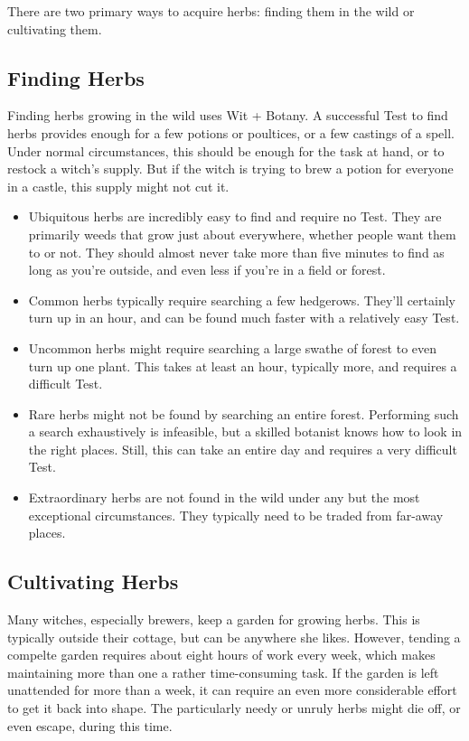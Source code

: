 There are two primary ways to acquire herbs: finding them in the wild or cultivating them.

\subsection{Finding Herbs}

Finding herbs growing in the wild uses Wit + Botany.
A successful Test to find herbs provides enough for a few potions or poultices, or a few castings of a spell.
Under normal circumstances, this should be enough for the task at hand, or to restock a witch's supply.
But if the witch is trying to brew a potion for everyone in a castle, this supply might not cut it.

\begin{itemize}
	\item Ubiquitous herbs are incredibly easy to find and require no Test.
		They are primarily weeds that grow just about everywhere, whether people want them to or not.
		They should almost never take more than five minutes to find as long as you're outside, and even less if you're in a field or forest.
	\item Common herbs typically require searching a few hedgerows.
		They'll certainly turn up in an hour, and can be found much faster with a relatively easy Test.
	\item Uncommon herbs might require searching a large swathe of forest to even turn up one plant.
		This takes at least an hour, typically more, and requires a difficult Test.
	\item Rare herbs might not be found by searching an entire forest.
		Performing such a search exhaustively is infeasible, but a skilled botanist knows how to look in the right places.
		Still, this can take an entire day and requires a very difficult Test.
	\item Extraordinary herbs are not found in the wild under any but the most exceptional circumstances.
		They typically need to be traded from far-away places.
\end{itemize}

\subsection{Cultivating Herbs}

Many witches, especially brewers, keep a garden for growing herbs.
This is typically outside their cottage, but can be anywhere she likes.
However, tending a compelte garden requires about eight hours of work every week, which makes maintaining more than one a rather time-consuming task.
If the garden is left unattended for more than a week, it can require an even more considerable effort to get it back into shape.
The particularly needy or unruly herbs might die off, or even escape, during this time.

